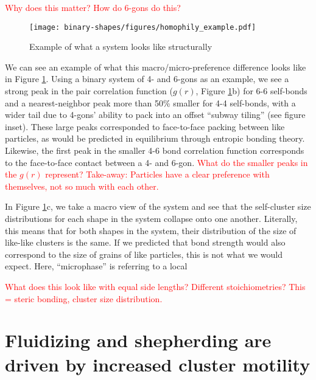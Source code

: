 \begin{figure*}[t]
\begin{figure*}[t]
\textcolor{red}{Why does this matter? How do 6-gons do this?}

\begin{figure}[t]
\begin{center}
\texttt{[image: binary-shapes/figures/homophily\_example.pdf]}
\caption{Example of what a system looks like structurally}
\label{fig:structure}
\end{center}
\end{figure}

We can see an example of what this macro/micro-preference difference looks like in Figure \ref{fig:structure}.
Using a binary system of 4- and 6-gons as an example, we see a strong peak in the pair correlation function ($g(r)$, Figure \ref{fig:structure}b) for 6-6 self-bonds and a nearest-neighbor peak more than 50\% smaller for 4-4 self-bonds, with a wider tail due to 4-gons' ability to pack into an offset ``subway tiling'' (see figure inset).
These large peaks corresponded to face-to-face packing between like particles, as would be predicted in equilibrium through entropic bonding theory\cite{entropic_bonds}.
Likewise, the first peak in the smaller 4-6 bond correlation function corresponds to the face-to-face contact between a 4- and 6-gon.
\textcolor{red}{What do the smaller peaks in the $g(r)$ represent? Take-away: Particles have a clear preference with themselves, not so much with each other.}

In Figure \ref{fig:structure}c, we take a macro view of the system and see that the self-cluster size distributions for each shape in the system collapse onto one another.
Literally, this means that for both shapes in the system, their distribution of the size of like-like clusters is the same.
If we predicted that bond strength would also correspond to the size of grains of like particles, this is not what we would expect.
Here, ``microphase'' is referring to a local

\textcolor{red}{What does this look like with equal side lengths? Different stoichiometries? This = steric bonding, cluster size distribution.}

\section{Fluidizing and shepherding are driven by increased cluster motility}
\label{sec:fluidizer}


\end{figure*}
\end{figure*}
